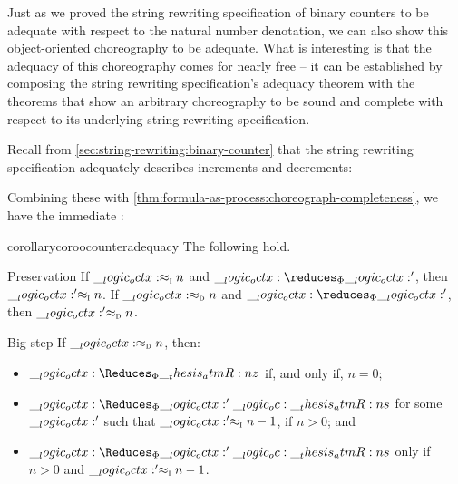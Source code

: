 Just as we proved the string rewriting specification of binary counters to be adequate with respect to the natural number denotation, we can also show this object-oriented choreography to be adequate.
What is interesting is that the adequacy of this choreography comes for nearly free -- it can be established by composing the string rewriting specification's adequacy theorem with the theorems that show an arbitrary choreography to be sound and complete with respect to its underlying string rewriting specification.




Recall from \cref{sec:string-rewriting:binary-counter} that the string rewriting specification adequately describes increments and decrements:
\thmincsmallstepadequacy*
%
\thmadequacysmalldecstring*
%
\coradequacydecstring*

Combining these  with \cref{thm:formula-as-process:choreograph-completeness}, we have the immediate :
\begin{restatable}[
  name=Adequacy of object-oriented choreography,
  label=cor:choreographies:oo-counter-adequacy
]{corollary}{coroocounteradequacy}
  The following hold.
  \begin{thmdescription}[nosep]
  \item[Preservation]
    If $\__logic_octx: \approx\sb{\text{\normalfont\scshape i}} n$ and $\octx \reduces_{\orsig} \octx'$, then $\__logic_octx:' \approx\sb{\text{\normalfont\scshape i}} n$.
    If $\__logic_octx: \approx\sb{\text{\normalfont\scshape d}} n$ and $\octx \reduces_{\orsig} \octx'$, then $\__logic_octx:' \approx\sb{\text{\normalfont\scshape d}} n$.

  \item[Big-step]
    If $\__logic_octx: \approx\sb{\text{\normalfont\scshape d}} n$, then:
    \begin{itemize}[nosep]
    \item $\octx \Reduces_{\orsig} \atmR{z}$ if, and only if, $n = 0$;
    \item $\octx \Reduces_{\orsig} \octx' \oc \atmR{s}$ for some $\__logic_octx:'$ such that $\__logic_octx:' \approx\sb{\text{\normalfont\scshape i}} n-1$, if $n > 0$; and
    \item $\octx \Reduces_{\orsig} \octx' \oc \atmR{s}$ only if $n > 0$ and $\__logic_octx:' \approx\sb{\text{\normalfont\scshape i}} n-1$.
    \end{itemize}
  \end{thmdescription}
\end{restatable}



